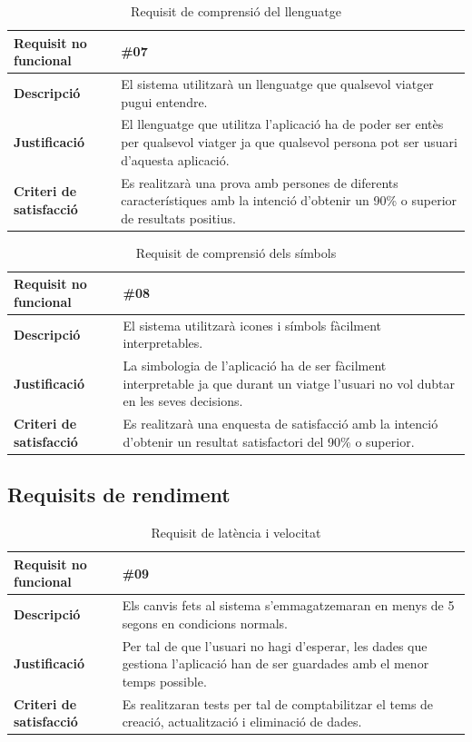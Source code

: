\begin{itemize}
\begin{table}[!h]
\begin{tabular}{|l|M|}
\hline
\textbf{Requisit no funcional }& \#07    \\ \hline
\textbf{Descripció} &  El sistema utilitzarà un llenguatge que qualsevol viatger pugui entendre. \\ \hline
\textbf{Justificació} & El llenguatge que utilitza l’aplicació ha de poder ser
entès per qualsevol viatger ja que qualsevol persona
pot ser usuari d’aquesta aplicació. \\ \hline
\textbf{Criteri de satisfacció} & Es realitzarà una prova amb persones de diferents característiques amb la intenció d’obtenir un 90\% o superior de resultats positius.
\\ \hline
\end{tabular}
\label{}
\caption{Requisit de comprensió del llenguatge}
\end{table}

\begin{table}[!h]
\begin{tabular}{|l|M|}
\hline
\textbf{Requisit no funcional }& \#08    \\ \hline
\textbf{Descripció} &  El sistema utilitzarà icones i símbols fàcilment interpretables. \\ \hline
\textbf{Justificació} & La simbologia de l’aplicació ha de ser fàcilment interpretable ja que durant un viatge l’usuari no vol dubtar en les seves decisions.   \\ \hline
\textbf{Criteri de satisfacció} & Es realitzarà una enquesta de satisfacció amb la intenció d’obtenir un resultat satisfactori del 90\% o superior.   \\ \hline
\end{tabular}
\label{}
\caption{Requisit de comprensió dels símbols}
\end{table}

\end{itemize}

\subsection{Requisits de rendiment}

\begin{table}[!h]
\begin{tabular}{|l|M|}
\hline
\textbf{Requisit no funcional }& \#09   \\ \hline
\textbf{Descripció} &  Els canvis fets al sistema s’emmagatzemaran en
menys de 5 segons en condicions normals.
 \\ \hline
\textbf{Justificació} & Per tal de que l’usuari no hagi d’esperar, les dades
que gestiona l’aplicació han de ser guardades amb el menor temps possible.
  \\ \hline
\textbf{Criteri de satisfacció} & Es realitzaran tests per tal de comptabilitzar el tems de creació, actualització i eliminació de dades.  \\ \hline
\end{tabular}
\label{}
\caption{Requisit de latència i velocitat}
\end{table}

